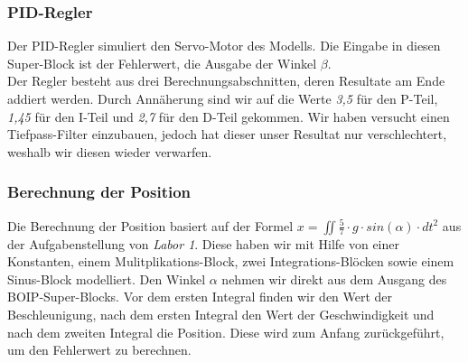 \subsubsection{PID-Regler}
Der PID-Regler simuliert den Servo-Motor des Modells. Die Eingabe in diesen Super-Block ist der Fehlerwert, die Ausgabe der Winkel $\beta$. \\
Der Regler besteht aus drei Berechnungsabschnitten, deren Resultate am Ende addiert werden. Durch Annäherung sind wir auf die Werte \textit{3,5} für den P-Teil, \textit{1,45} für den I-Teil und \textit{2,7} für den D-Teil gekommen. Wir haben versucht einen Tiefpass-Filter einzubauen, jedoch hat dieser unser Resultat nur verschlechtert, weshalb wir diesen wieder verwarfen.

\subsubsection{Berechnung der Position}
Die Berechnung der Position basiert auf der Formel $ x = \iint \frac{5}{7} \cdot g \cdot sin(\alpha) \cdot d t^2 $ aus der Aufgabenstellung von \textit{Labor 1}. Diese haben wir mit Hilfe von einer Konstanten, einem Mulitplikations-Block, zwei Integrations-Blöcken sowie einem Sinus-Block modelliert. Den Winkel $\alpha $ nehmen wir direkt aus dem Ausgang des BOIP-Super-Blocks. Vor dem ersten Integral finden wir den Wert der Beschleunigung, nach dem ersten Integral den Wert der Geschwindigkeit und nach dem zweiten Integral die Position. Diese wird zum Anfang zurückgeführt, um den Fehlerwert zu berechnen.

